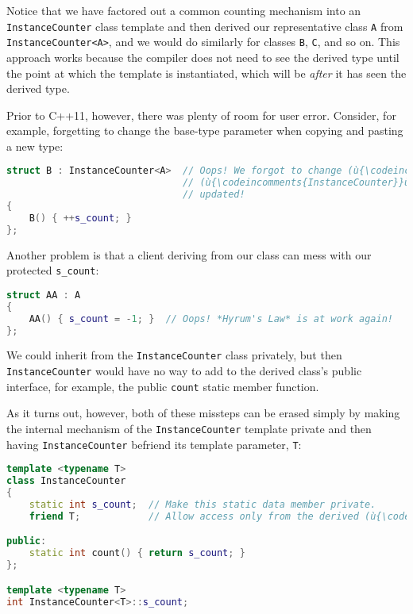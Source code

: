 \noindent Notice that we have factored out a common counting mechanism into an
\texttt{InstanceCounter} class template and then derived our
representative class \texttt{A} from \texttt{InstanceCounter<A>}, and we
would do similarly for classes \texttt{B}, \texttt{C}, and so on. This
approach works because the compiler does not need to see the derived
type until the point at which the template is instantiated, which will
be \emph{after} it has seen the derived type.

Prior to C++11, however, there was plenty of room for user error.
Consider, for example, forgetting to change the base-type parameter when
copying and pasting a new type:

\begin{lstlisting}[language=C++]
struct B : InstanceCounter<A>  // Oops! We forgot to change (ù{\codeincomments{A}}ù) to (ù{\codeincomments{B}}ù) in
                               // (ù{\codeincomments{InstanceCounter}}ù): The wrong count will be
                               // updated!
{
    B() { ++s_count; }
};
\end{lstlisting}

\noindent Another problem is that a client deriving from our class can mess with
our protected \texttt{s\_count}:

\begin{lstlisting}[language=C++]
struct AA : A
{
    AA() { s_count = -1; }  // Oops! *Hyrum's Law* is at work again!
};
\end{lstlisting}

\noindent We could inherit from the \texttt{InstanceCounter} class privately, but
then \texttt{InstanceCounter} would have no way to add to the derived
class's public interface, for example, the public \texttt{count} static
member function.

As it turns out, however, both of these missteps can be erased simply by
making the internal mechanism of the \texttt{InstanceCounter} template
private and then having \mbox{\texttt{InstanceCounter}} befriend its template
parameter, \texttt{T}:

\begin{lstlisting}[language=C++]
template <typename T>
class InstanceCounter
{
    static int s_count;  // Make this static data member private.
    friend T;            // Allow access only from the derived (ù{\codeincomments{T}}ù).

public:
    static int count() { return s_count; }
};

template <typename T>
int InstanceCounter<T>::s_count;
\end{lstlisting}

